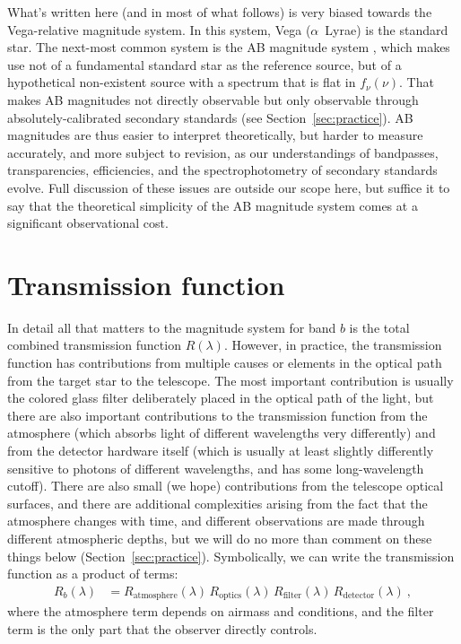 \documentclass[10pt]{article}
\newcommand{\sectionname}{Section}
\newcommand{\secref}[1]{\sectionname~\ref{#1}}
\begin{document}
What's written here (and in most of what follows) is very biased towards the Vega-relative magnitude system.
In this system, Vega ($\alpha$~Lyrae) is the standard star.
The next-most common system is the AB magnitude system \cite{ab}, which makes use not of a fundamental standard star as the reference source, but of a hypothetical non-existent source with a spectrum that is flat in $f_\nu(\nu)$.
That makes AB magnitudes not directly observable but only observable through absolutely-calibrated secondary standards (see \secref{sec:practice}).
AB magnitudes are thus easier to interpret theoretically, but harder to measure accurately, and more subject to revision, as our understandings of bandpasses, transparencies, efficiencies, and the spectrophotometry of secondary standards evolve.
Full discussion of these issues are outside our scope here, but suffice it to say that the theoretical simplicity of the AB magnitude system comes at a significant observational cost.

\section{Transmission function}\label{sec:transmission}

In detail all that matters to the magnitude system for band $b$ is the total combined transmission function $R(\lambda)$.
However, in practice, the transmission function has contributions from multiple causes or elements in the optical path from the target star to the telescope.
The most important contribution is usually the colored glass filter deliberately placed in the optical path of the light, but there are also important contributions to the transmission function from the atmosphere (which absorbs light of different wavelengths very differently) and from the detector hardware itself (which is usually at least slightly differently sensitive to photons of different wavelengths, and has some long-wavelength cutoff).
There are also small (we hope) contributions from the telescope optical surfaces,
and there are additional complexities arising from the fact that the atmosphere changes with time, and different observations are made through different atmospheric depths, but we will do no more than comment on these things below (\secref{sec:practice}).
Symbolically, we can write the transmission function as a product of terms:
\begin{align}
    R_b(\lambda) &= R_\text{atmosphere}(\lambda)\,R_\text{optics}(\lambda)\,R_\text{filter}(\lambda)\,R_\text{detector}(\lambda)~,
\end{align}
where the atmosphere term depends on airmass and conditions, and the filter term is the only part that the observer directly controls.
\end{document}
